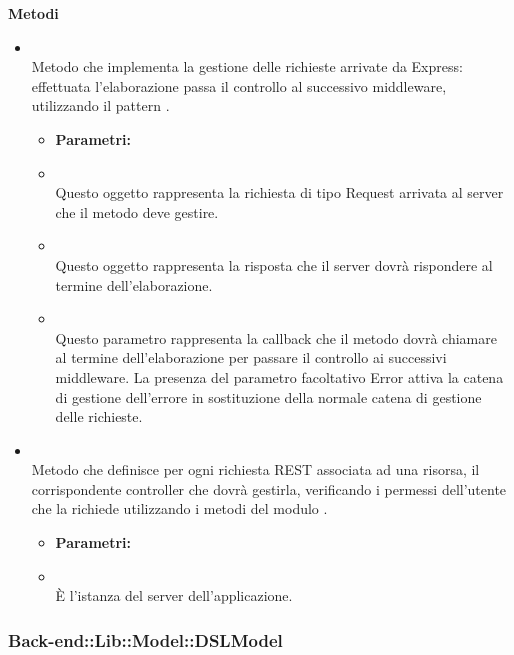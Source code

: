 		\textbf{Metodi} 
	\begin{itemize}
					\item[] \textbf{} \\ Metodo che implementa la gestione delle richieste arrivate da Express: effettuata l'elaborazione passa il controllo al successivo middleware, utilizzando il pattern .
						\begin{itemize}\addtolength{\itemsep}{-0.5\baselineskip}
						\item[] \textbf{Parametri:}
						\item[]  \\ Questo oggetto rappresenta la richiesta di tipo Request arrivata al server che il metodo deve gestire.	
						\item[]  \\ Questo oggetto rappresenta la risposta che il server dovrà rispondere al termine dell'elaborazione.	
						\item[]  \\ Questo parametro rappresenta la callback che il metodo dovrà chiamare al termine dell'elaborazione per passare il controllo ai successivi middleware.
La presenza del parametro facoltativo Error attiva la catena di gestione dell'errore in sostituzione della normale catena di gestione delle richieste.	
				\end{itemize}
					\item[] \textbf{} \\ Metodo che definisce per ogni richiesta REST associata ad una risorsa, il corrispondente controller che dovrà gestirla, verificando i permessi dell'utente che la richiede utilizzando i metodi del modulo .

						\begin{itemize}\addtolength{\itemsep}{-0.5\baselineskip}
						\item[] \textbf{Parametri:}
						\item[]  \\ È l'istanza del server dell'applicazione.	
				\end{itemize}
		\end{itemize}
	\subsubsection{Back-end::Lib::Model::DSLModel} 
